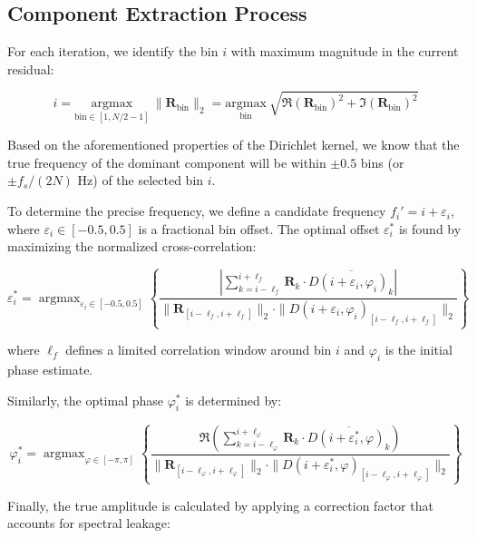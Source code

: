 \documentclass[11pt,twoside]{report}
\DeclareMathOperator*{\argmax}{argmax}
\numberwithin{thm}{section}
\numberwithin{equation}{section}
\begin{document}
\subsection{Component Extraction Process}

For each iteration, we identify the bin $i$ with maximum magnitude in the current residual:

\begin{equation}
\label{eq:peak_bin}
i = \underset{\text{bin} \in [1, N/2-1]}{\mathrm{argmax}}\ \|\mathbf{R}_{\text{bin}}\|_2 = \underset{\text{bin}}{\mathrm{argmax}}\ \sqrt{\Re(\mathbf{R}_{\text{bin}})^2 + \Im(\mathbf{R}_{\text{bin}})^2}
\end{equation}

Based on the aforementioned properties of the Dirichlet kernel, we know that the true frequency of the dominant component will be within $\pm 0.5$ bins (or $\pm f_s/(2N)$ Hz) of the selected bin $i$.

To determine the precise frequency, we define a candidate frequency $f_i' = i + \varepsilon_i$, where $\varepsilon_i \in [-0.5, 0.5]$ is a fractional bin offset. The optimal offset $\varepsilon_i^*$ is found by maximizing the normalized cross-correlation:

\begin{equation}
\label{eq:optimal_freq}
\varepsilon_i^* = \argmax_{\varepsilon_i \in [-0.5, 0.5]} \left\{ \frac{\left|\sum_{k=i-\ell_f}^{i+\ell_f} \mathbf{R}_k \cdot \overline{D(i + \varepsilon_i, \varphi_i)_k}\right|}{\|\mathbf{R}_{[i-\ell_f, i+\ell_f]}\|_2 \cdot \|D(i + \varepsilon_i, \varphi_i)_{[i-\ell_f, i+\ell_f]}\|_2} \right\}
\end{equation}

where $\ell_f$ defines a limited correlation window around bin $i$ and $\varphi_i$ is the initial phase estimate.

Similarly, the optimal phase $\varphi_i^*$ is determined by:

\begin{equation}
\label{eq:optimal_phase}
\varphi_i^* = \argmax_{\varphi \in [-\pi, \pi]} \left\{ \frac{\Re\left(\sum_{k=i-\ell_\varphi}^{i+\ell_\varphi} \mathbf{R}_k \cdot \overline{D(i + \varepsilon_i^*, \varphi)_k}\right)}{\|\mathbf{R}_{[i-\ell_\varphi, i+\ell_\varphi]}\|_2 \cdot \|D(i + \varepsilon_i^*, \varphi)_{[i-\ell_\varphi, i+\ell_\varphi]}\|_2} \right\}
\end{equation}

Finally, the true amplitude is calculated by applying a correction factor that accounts for spectral leakage:
\end{document}
